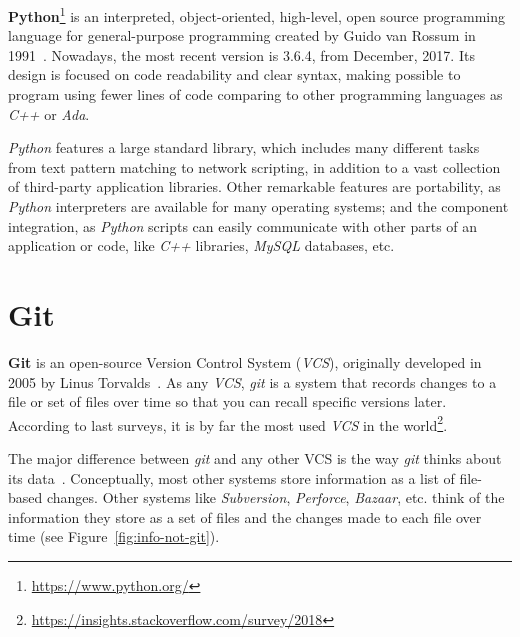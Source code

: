 \documentclass[a4paper, 12pt]{book}
\begin{document}
\textbf{Python}\footnote{\url{https://www.python.org/}} is an interpreted, object-oriented, high-level, open source
programming language for general-purpose programming created by Guido van Rossum in 1991~\cite{van2007python}. Nowadays, the most
recent version is 3.6.4, from December, 2017. Its design is focused on code readability and clear syntax, making
possible to program using fewer lines of code comparing to other programming languages as \emph{C++} or \emph{Ada}.

\emph{Python} features a large standard library, which includes many different tasks from text pattern matching to network
scripting, in addition to a vast collection of third-party application libraries.
Other remarkable features are portability, as \emph{Python} interpreters are available for many operating systems;
and the component integration, as \emph{Python} scripts can easily communicate with other parts of an application or code,
like \emph{C++} libraries, \emph{MySQL} databases, etc.
\section{Git}
\label{sec:git}

\textbf{Git} is an open-source Version Control System (\emph{VCS}), originally developed in 2005 by Linus Torvalds~\cite{somasundaram2013git}.
As any \emph{VCS}, \emph{git} is a system that records changes to a file or set of files over time
so that you can recall specific versions later. According to last surveys, it is by far the most used \emph{VCS} in the
world\footnote{\url{https://insights.stackoverflow.com/survey/2018}}.

The major difference between \emph{git} and any other VCS is the way \emph{git} thinks about its data~\cite{ruparelia2010history}.
Conceptually, most other systems store information as a list of file-based changes. Other systems like \textit{Subversion},
\textit{Perforce}, \textit{Bazaar}, etc. think of the information they store as a set of files and the changes made to each
file over time (see Figure~\ref{fig:info-not-git}).
\end{document}
